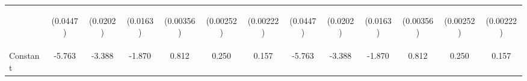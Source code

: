 \documentclass[]{article}
\begin{document}
\begin{center}
\begin{tabular}{lcccccccccccc}
\vspace{4pt} & \begin{footnotesize}(0.0447)\end{footnotesize} & \begin{footnotesize}(0.0202)\end{footnotesize} & \begin{footnotesize}(0.0163)\end{footnotesize} & \begin{footnotesize}(0.00356)\end{footnotesize} & \begin{footnotesize}(0.00252)\end{footnotesize} & \begin{footnotesize}(0.00222)\end{footnotesize} & \begin{footnotesize}(0.0447)\end{footnotesize} & \begin{footnotesize}(0.0202)\end{footnotesize} & \begin{footnotesize}(0.0163)\end{footnotesize} & \begin{footnotesize}(0.00356)\end{footnotesize} & \begin{footnotesize}(0.00252)\end{footnotesize} & \begin{footnotesize}(0.00222)\end{footnotesize} \\
Constant & -5.763 & -3.388 & -1.870 & 0.812 & 0.250 & 0.157 & -5.763 & -3.388 & -1.870 & 0.812 & 0.250 & 0.157 \\

\end{tabular}
\end{center}
\end{document}
